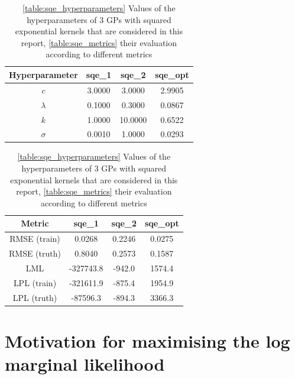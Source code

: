 \documentclass{article}
\begin{document}
\begin{table}[ht]
    \centering
    \begin{subtable}[t]{0.45\textwidth}
        \centering
        \begin{tabular}[t]{|c|c|c|c|}
            \hline
            Hyperparameter & sqe\_1 & sqe\_2 & sqe\_opt \\
            \hline
            $c$ & 3.0000 & 3.0000 & 2.9905 \\
            $\lambda$ & 0.1000 & 0.3000 & 0.0867 \\
            $k$ & 1.0000 & 10.0000 & 0.6522 \\
            $\sigma$ & 0.0010 & 1.0000 & 0.0293 \\
            \hline
        \end{tabular}
        \caption{}
        \label{table:sqe_hyperparameters}
    \end{subtable}
    \begin{subtable}[t]{0.45\textwidth}
        \centering
        \begin{tabular}[t]{|c|c|c|c|}
            \hline
            Metric & sqe\_1 & sqe\_2 & sqe\_opt \\
            \hline
            RMSE (train) & 0.0268 & 0.2246 & 0.0275 \\
            RMSE (truth) & 0.8040 & 0.2573 & 0.1587 \\
            LML & -327743.8 & -942.0 & 1574.4 \\
            LPL (train) & -321611.9 & -875.4 & 1954.9 \\
            LPL (truth) & -87596.3 & -894.3 & 3366.3 \\
            \hline
        \end{tabular}
        \caption{}
        \label{table:sqe_metrics}
    \end{subtable}
    \caption{\ref{table:sqe_hyperparameters} Values of the hyperparameters of 3 GPs with squared exponential kernels that are considered in this report, \ref{table:sqe_metrics} their evaluation according to different metrics}
    \label{table:sqe}
\end{table}


\appendix
\section{Motivation for maximising the log marginal likelihood}\label{appendix:why_lml}
\end{document}
